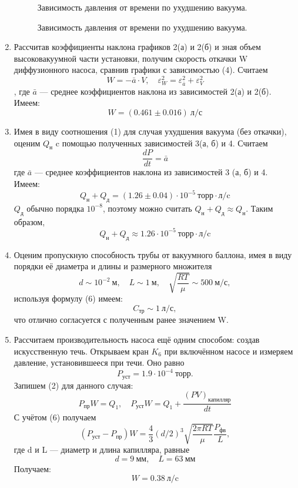 \documentclass[a4paper,12pt]{article} %
\begin{document}
\begin{enumerate}
\begin{figure}[H]
        \caption{Зависимость давления от времени по ухудшению вакуума.}
      \end{figure}
        \begin{figure}[H]
            \caption{Зависимость давления от времени по ухудшению вакуума.}
        \end{figure}

    \item
          Рассчитав коэффициенты наклона графиков 2(а) и 2(б) и зная объем высоковакуумной части установки, получим скорость откачки W диффузионного насоса, сравнив графики с зависимостью (4). Считаем $$W = -\bar{a}\cdot V, \quad\varepsilon_W^2 = \varepsilon_{\bar{a}}^2 + \varepsilon_V^2$$,  где $\bar{a}$ --- среднее коэффициентов наклона из зависимостей 2(а) и 2(б). Имеем:
          $$W = (0.461\pm0.016) ~\text{л/с}$$
    \item
          Имея в виду соотношения (1) для случая ухудшения вакуума (без откачки), оценим $Q_\text{н}$ c помощью полученных зависимостей 3(а, б) и 4. Считаем $$\frac{dP}{dt} = \bar{a}$$ где $\bar{a}$ --- среднее коэффициентов наклона из зависимостей 3 (а, б) и 4. Имеем:
          $$Q_\text{н} + Q_\text{д} = (1.26\pm0.04)\cdot 10^{-5} ~\text{торр}\cdot\text{л/c}$$
          $Q_\text{д}$ обычно порядка $10^{-8}$, поэтому можно считать $Q_\text{н} + Q_\text{д} \approx Q_\text{н}$. Таким образом,
          $$Q_\text{н} + Q_\text{д} \approx 1.26\cdot 10^{-5} ~\text{торр}\cdot\text{л/c}$$
    \item Оценим пропускную способность трубы от вакуумного баллона, имея в виду порядки её диаметра и длины и размерного множителя $$d \sim 10^{-2}~\text{м},\quad L \sim 1 ~\text{м},\quad \sqrt{\frac{RT}{\mu}} \sim 500 ~\text{м/с},$$ используя формулу (6) имеем:
          $$C_\text{тр} \sim 1 ~\text{л/с},$$
          что отлично согласуется с полученным ранее значением W.
    \item
          Рассчитаем производительность насоса ещё одним способом: создав искусственную течь. Открываем кран $K_6$ при включённом  насосе и измеряем давление, установившееся при течи. Оно равно $$P_\text{уст} = 1.9 \cdot 10^{-4} ~\text{торр}.$$
          Запишем (2) для данного случая:
          $$P_\text{пр}W = Q_1, \quad P_\text{уст}W = Q_1 + \frac{(PV)_\text{капилляр}}{dt}$$
          С учётом (6) получаем
          $$(P_\text{уст} - P_\text{пр})W = \frac{4}{3}(d/2)^3\sqrt{\frac{2\pi RT}{\mu}}\frac{P_\text{фв}}{L},$$
          где d и L --- диаметр и длина капилляра, равные
          $$d = 9 ~\text{мм},\quad L = 63 ~\text{мм}$$
          Получаем:
          $$W = 0.38 ~\text{л/c}$$
\end{enumerate}
\end{document}
